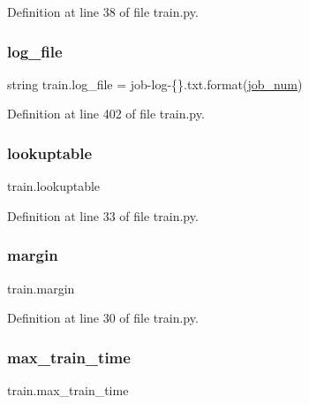 Definition at line 38 of file train.\+py.

\mbox{\label{namespacetrain_a30cb844466eb30a5ba783789c8c0f43f}} 
\subsubsection{\texorpdfstring{log\+\_\+file}{log\_file}}
{\footnotesize\ttfamily string train.\+log\+\_\+file = \textquotesingle{}job-\/log-\/\{\}.txt\textquotesingle{}.format(\hyperlink{namespacetrain_aa21180e9a522633e69afac0c0e608b85}{job\+\_\+num})}



Definition at line 402 of file train.\+py.

\mbox{\label{namespacetrain_a15f59652a2a63b1f48e0c6b97e9ef97a}} 
\subsubsection{\texorpdfstring{lookuptable}{lookuptable}}
{\footnotesize\ttfamily train.\+lookuptable}



Definition at line 33 of file train.\+py.

\mbox{\label{namespacetrain_a543bbe86c3259fb3c872266fd985a87e}} 
\subsubsection{\texorpdfstring{margin}{margin}}
{\footnotesize\ttfamily train.\+margin}



Definition at line 30 of file train.\+py.

\mbox{\label{namespacetrain_adef31c34753713d14a20eb6f1c478f3d}} 
\subsubsection{\texorpdfstring{max\+\_\+train\+\_\+time}{max\_train\_time}}
{\footnotesize\ttfamily train.\+max\+\_\+train\+\_\+time}



